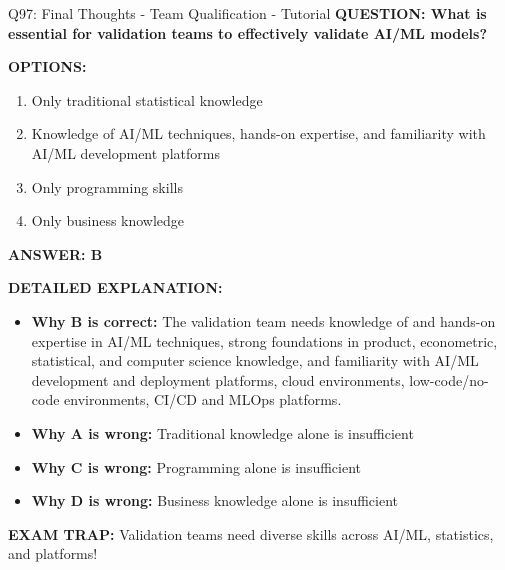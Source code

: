 \documentclass[8pt]{beamer}
\begin{document}
	\begin{frame}{Q97: Final Thoughts - Team Qualification - Tutorial}
		\fontsize{6.5}{7.5}\selectfont
		\textbf{QUESTION: What is essential for validation teams to effectively validate AI/ML models?}
		
		\vspace{0.1cm}
		\textbf{OPTIONS:}
		\begin{enumerate}
			\item Only traditional statistical knowledge
			\item Knowledge of AI/ML techniques, hands-on expertise, and familiarity with AI/ML development platforms
			\item Only programming skills
			\item Only business knowledge
		\end{enumerate}
		
		\vspace{0.1cm}
		\textcolor{myblue}{\textbf{ANSWER: B}}
		
		\vspace{0.1cm}
		\textbf{DETAILED EXPLANATION:}
		\begin{itemize}
			\item \textbf{Why B is correct:} The validation team needs knowledge of and hands-on expertise in AI/ML techniques, strong foundations in product, econometric, statistical, and computer science knowledge, and familiarity with AI/ML development and deployment platforms, cloud environments, low-code/no-code environments, CI/CD and MLOps platforms.
			\item \textbf{Why A is wrong:} Traditional knowledge alone is insufficient
			\item \textbf{Why C is wrong:} Programming alone is insufficient
			\item \textbf{Why D is wrong:} Business knowledge alone is insufficient
		\end{itemize}
		
		\textcolor{myred}{\textbf{EXAM TRAP:}} Validation teams need \textcolor{myblue}{diverse skills across AI/ML, statistics, and platforms}!
	\end{frame}
	
\end{document}
